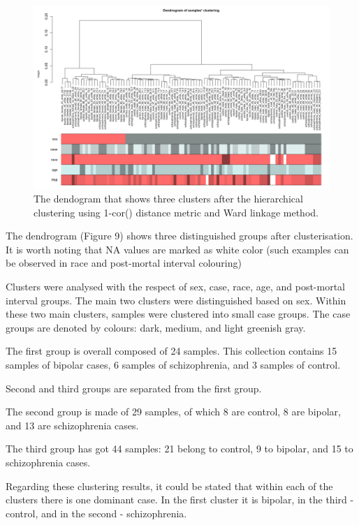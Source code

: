 \documentclass[
]{article}
\begin{document}
\begin{figure}[!h]
  \begin{center}
    \includegraphics[width=150mm]{./14.png}
    \caption{
      The dendogram that shows three clusters after the hierarchical clustering
      using 1-cor() distance metric and Ward linkage method.
    }
  \end{center}
\end{figure}

The dendrogram (Figure 9) shows three distinguished groups after
clusterisation. It is worth noting that NA values are marked as white
color (such examples can be observed in race and post-mortal interval
colouring)

Clusters were analysed with the respect of sex, case, race, age, and
post-mortal interval groups. The main two clusters were distinguished
based on sex. Within these two main clusters, samples were clustered
into small case groups. The case groups are denoted by colours: dark,
medium, and light greenish gray.

The first group is overall composed of 24 samples. This collection
contains 15 samples of bipolar cases, 6 samples of schizophrenia, and 3
samples of control.

Second and third groups are separated from the first group.

The second group is made of 29 samples, of which 8 are control, 8 are
bipolar, and 13 are schizophrenia cases.

The third group has got 44 samples: 21 belong to control, 9 to bipolar,
and 15 to schizophrenia cases.

Regarding these clustering results, it could be stated that within each
of the clusters there is one dominant case. In the first cluster it is
bipolar, in the third - control, and in the second - schizophrenia.
\end{document}
